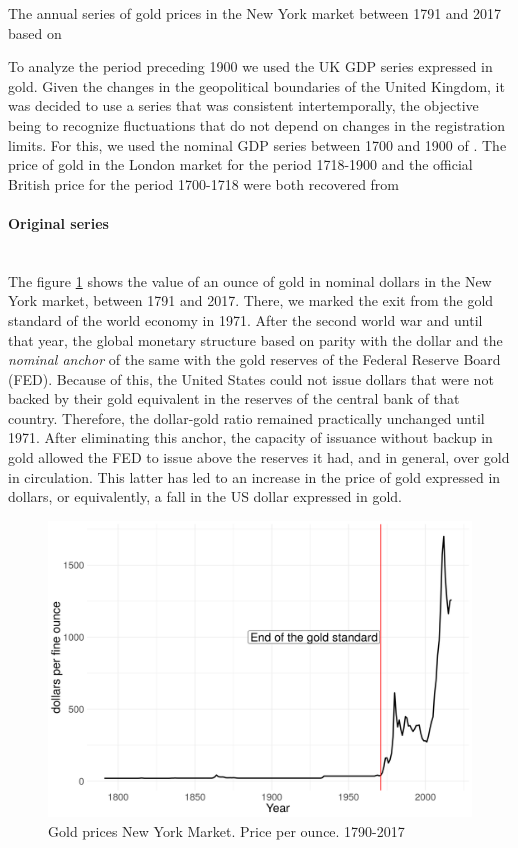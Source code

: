 \documentclass[a4paper,10cpi]{article}
\begin{document}
	The annual series of gold prices in the New York market between 1791 and 2017 based on \cite{officer2018gold}
	
	To analyze the period preceding 1900 we used the UK GDP series expressed in gold. Given the changes in the geopolitical boundaries of the United Kingdom, it was decided to use a series that was consistent intertemporally, the objective being to recognize fluctuations that do not depend on changes in the registration limits. For this, we used the nominal GDP series between 1700 and 1900 of \cite{Williamson2018uk}. The price of gold in the London market for the period 1718-1900 and the official British price for the period 1700-1718 were both recovered from \cite{officer2018gold}
	
	
	\paragraph{Original series}\mbox{}\\
	
	The figure \ref{fig:oro} shows the value of an ounce of gold in nominal dollars in the New York market, between 1791 and 2017. There, we marked the exit from the gold standard of the world economy in 1971. After the second world war and until that year, the global monetary structure based on parity with the dollar and the \textit{nominal anchor} of the same with the gold reserves of the Federal Reserve Board (FED). Because of this, the United States could not issue dollars that were not backed by their gold equivalent in the reserves of the central bank of that country. Therefore, the dollar-gold ratio remained practically unchanged until 1971. After eliminating this anchor, the capacity of issuance without backup in gold allowed the FED to issue above the reserves it had, and in general, over gold in circulation. This latter has led to an increase in the price of gold expressed in dollars, or equivalently, a fall in the US dollar expressed in gold.
	
	\begin{figure}[H]
		\centering
		\includegraphics[width=0.75\linewidth]{oro_en.png}
		\caption{Gold prices New York Market. Price per ounce. 1790-2017}\label{fig:oro}
	\end{figure}
	
\end{document}

